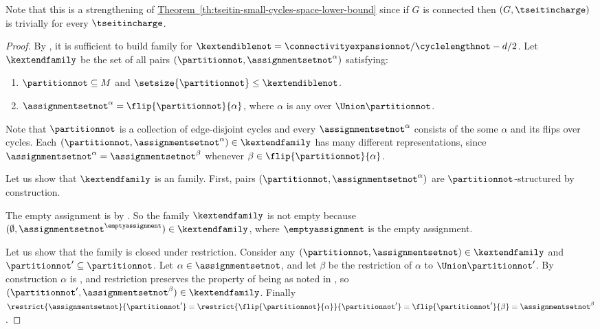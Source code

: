 \documentclass[11pt]{article}
\numberwithin{equation}{section}
\theoremstyle{definition}
\theoremstyle{plain}
\newcommand{\expref}[2]{\hyperref[#2]{#1~\ref{#2}}}
\begin{document}
Note that this is a strengthening of \expref{Theorem}{th:tseitin-small-cycles-space-lower-bound} since if $G$ is connected then $(G,\tseitincharge)$ is trivially \Gnonsplitting for every $\tseitincharge$.


\begin{proof}
  By , it is sufficient to build \akextendible family for $\kextendiblenot = \connectivityexpansionnot / \cyclelengthnot - d/2$. Let $\kextendfamily$ be the set of all pairs $(\partitionnot,\assignmentsetnot^\alpha)$ satisfying:
  \begin{enumerate}
  \item $\partitionnot\subseteq M$ and $\setsize{\partitionnot}\leq \kextendiblenot$.
  \item $\assignmentsetnot^{\alpha}=\flip{\partitionnot}{\alpha}$, where $\alpha$ is any \nonsplittingassignment over $\Union \partitionnot$.
  \end{enumerate}
  Note that $\partitionnot$ is a collection of edge-disjoint cycles and every $\assignmentsetnot^\alpha$ consists of the some \nonsplittingassignment $\alpha$ and its flips over cycles. Each $(\partitionnot,\assignmentsetnot^{\alpha}) \in \kextendfamily$ has many different representations, since $\assignmentsetnot^{\alpha}=\assignmentsetnot^{\beta}$ whenever $\beta\in\flip{\partitionnot}{\alpha}$.

  Let us show that $\kextendfamily$ is an \kextendibleNok family. First, pairs $(\partitionnot,\assignmentsetnot^{\alpha})$ are $\partitionnot$-structured by construction.
  
  The empty assignment is \nonsplitting by . So the family $\kextendfamily$ is not empty because $(\emptyset,\assignmentsetnot^{\emptyassignment})\in\kextendfamily$, where $\emptyassignment$ is the empty assignment.

  Let us show that the family is closed under restriction. Consider any $(\partitionnot,\assignmentsetnot)\in\kextendfamily$ and $\partitionnot'\subseteq \partitionnot$. Let $\alpha\in\assignmentsetnot$, and let $\beta$ be the restriction of $\alpha$ to $\Union\partitionnot'$. By construction $\alpha$ is \nonsplitting, and restriction preserves the property of being \nonsplitting as noted in , so $(\partitionnot',\assignmentsetnot^{\beta})\in\kextendfamily$. Finally $\restrict{\assignmentsetnot}{\partitionnot'}=\restrict{\flip{\partitionnot}{\alpha}}{\partitionnot'}=\flip{\partitionnot'}{\beta}=\assignmentsetnot^{\beta}$.


\end{proof}
\end{document}
